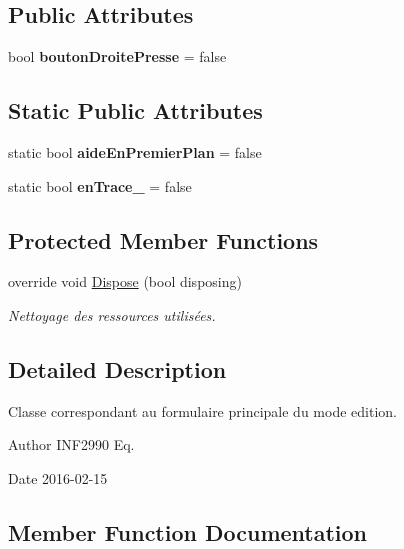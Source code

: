\subsection*{Public Attributes}
\begin{DoxyCompactItemize}
\item 
bool {\bfseries bouton\+Droite\+Presse} = false
\end{DoxyCompactItemize}
\subsection*{Static Public Attributes}
\begin{DoxyCompactItemize}
\item 
static bool {\bfseries aide\+En\+Premier\+Plan} = false
\item 
static bool {\bfseries en\+Trace\+\_\+} = false
\end{DoxyCompactItemize}
\subsection*{Protected Member Functions}
\begin{DoxyCompactItemize}
\item 
override void \hyperlink{class_interface_graphique_1_1_edition_ad3404dbef381fe04da6db94114d6bcc0}{Dispose} (bool disposing)
\begin{DoxyCompactList}\small\item\em Nettoyage des ressources utilisées. \end{DoxyCompactList}\end{DoxyCompactItemize}


\subsection{Detailed Description}
Classe correspondant au formulaire principale du mode edition. 

\begin{DoxyAuthor}{Author}
I\+N\+F2990 Eq. 
\end{DoxyAuthor}
\begin{DoxyDate}{Date}
2016-\/02-\/15 
\end{DoxyDate}


\subsection{Member Function Documentation}
